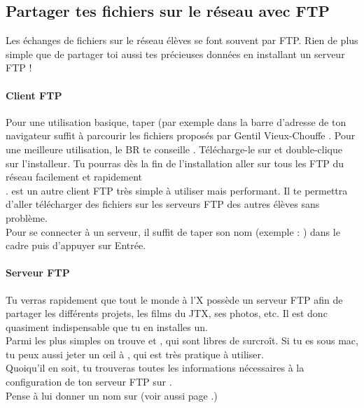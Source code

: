 \subsection{Partager tes fichiers sur le r\'eseau avec FTP}

Les \'echanges de fichiers sur le r\'eseau \'el\`eves se font souvent par FTP. Rien de plus simple que de partager toi aussi tes pr\'ecieuses donn\'ees en installant un serveur FTP !

\paragraph{Client FTP}
Pour une utilisation basique, taper   (par exemple  dans la barre d'adresse de ton navigateur suffit \`a parcourir les fichiers propos\'es par \og Gentil Vieux-Chouffe \fg.
Pour une meilleure utilisation, le BR te conseille . T\'el\'echarge-le sur  et double-clique sur l'installeur.
Tu pourras d\`es la fin de l'installation aller sur tous les FTP du r\'eseau facilement et rapidement \\.
  est un autre client FTP tr\`es simple \`a  utiliser mais performant. Il te permettra d'aller t\'el\'echarger des fichiers sur les serveurs FTP des autres \'el\`eves sans probl\`eme.\\
Pour se connecter \`a  un serveur, il suffit de taper son nom (exemple : ) dans le cadre  puis d'appuyer sur Entr\'ee.\\


\paragraph{Serveur FTP}
Tu verras rapidement que tout le monde \`a  l'X poss\`ede un serveur FTP
afin de partager les diff\'erents projets, les films du JTX, ses
photos, etc. Il est donc quasiment indispensable que tu en installes un.\\

Parmi les plus simples on trouve  et , qui sont libres de surcro\^{i}t.
Si tu es sous mac, tu peux aussi jeter un \oe{}il à , qui est très pratique à utiliser.\\
Quoiqu'il en soit, tu trouveras toutes les informations n\'ecessaires \`a la configuration de ton serveur FTP sur .\\
Pense \`a lui donner un nom sur  (voir aussi page \pageref{dnsapp}.)
